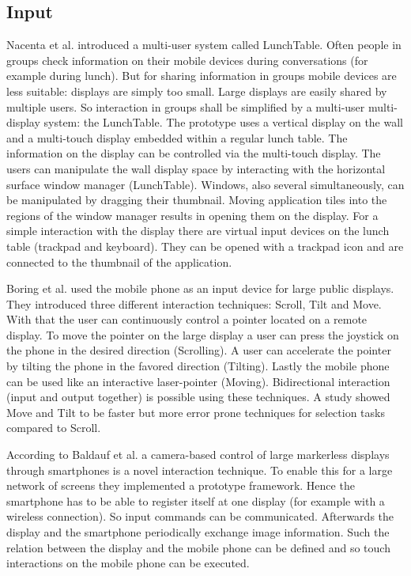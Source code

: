 \subsection{Input}
Nacenta et al. \cite{a18-nacenta} introduced a multi-user system called LunchTable.
Often people in groups check information on their mobile devices during conversations (for example during lunch). But for sharing information in groups mobile devices are less suitable: displays are simply too small.
Large displays are easily shared by multiple users. So interaction in groups shall be simplified by a multi-user multi-display system: the LunchTable.
The prototype uses a vertical display on the wall and a multi-touch display embedded within a regular lunch table.
The information on the display can be controlled via the multi-touch display.
The users can manipulate the wall display space by interacting with the horizontal surface window manager (LunchTable).
Windows, also several simultaneously, can be manipulated by dragging their thumbnail. Moving application tiles into the regions of the window manager results in opening them on the display.
For a simple interaction with the display there are virtual input devices on the lunch table (trackpad and keyboard).
They can be opened with a trackpad icon and are connected to the thumbnail of the application.

Boring et al. \cite{p161-boring} used the mobile phone as an input device for large public displays.
They introduced three different interaction techniques: Scroll, Tilt and Move. With that the user can continuously control a pointer located on a remote display.
To move the pointer on the large display a user can press the joystick on the phone in the desired direction (Scrolling).
A user can accelerate the pointer by tilting the phone in the favored direction (Tilting).
Lastly the mobile phone can be used like an interactive laser-pointer (Moving).
Bidirectional interaction (input and output together) is possible using these techniques.
A study showed Move and Tilt to be faster but more error prone techniques for selection tasks compared to Scroll.

According to Baldauf et al. \cite{a4-baldauf} a camera-based control of large markerless displays through smartphones is a novel interaction technique.
To enable this for a large network of screens they implemented a prototype framework.
Hence the smartphone has to be able to register itself at one display (for example with a wireless connection).
So input commands can be communicated.
Afterwards the display and the smartphone periodically exchange image information.
Such the relation between the display and the mobile phone can be defined and so touch interactions on the mobile phone can be executed.

